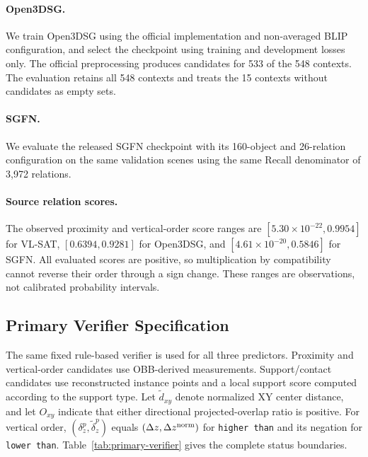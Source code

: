 \paragraph{Open3DSG.}
We train Open3DSG using the official implementation and non-averaged BLIP configuration, and select the checkpoint using training and development losses only. The official preprocessing produces candidates for 533 of the 548 contexts. The evaluation retains all 548 contexts and treats the 15 contexts without candidates as empty sets.

\paragraph{SGFN.}
We evaluate the released SGFN checkpoint with its 160-object and 26-relation configuration on the same validation scenes using the same Recall denominator of 3,972 relations.

\paragraph{Source relation scores.}
The observed proximity and vertical-order score ranges are
\([5.30{\times}10^{-22},0.9954]\) for VL-SAT,
\([0.6394,0.9281]\) for Open3DSG, and
\([4.61{\times}10^{-20},0.5846]\) for SGFN. All evaluated scores are positive, so multiplication by compatibility cannot reverse their order through a sign change. These ranges are observations, not calibrated probability intervals.

\subsection{Primary Verifier Specification}

The same fixed rule-based verifier is used for all three predictors. Proximity and vertical-order candidates use OBB-derived measurements. Support/contact candidates use reconstructed instance points and a local support score computed according to the support type. Let \(\widetilde d_{xy}\) denote normalized XY center distance, and let \(O_{xy}\) indicate that either directional projected-overlap ratio is positive. For vertical order, \((\delta_z^p,\widetilde\delta_z^p)\) equals \((\Delta z,\Delta z^{\rm norm})\) for \texttt{higher than} and its negation for \texttt{lower than}. Table~\ref{tab:primary-verifier} gives the complete status boundaries.


